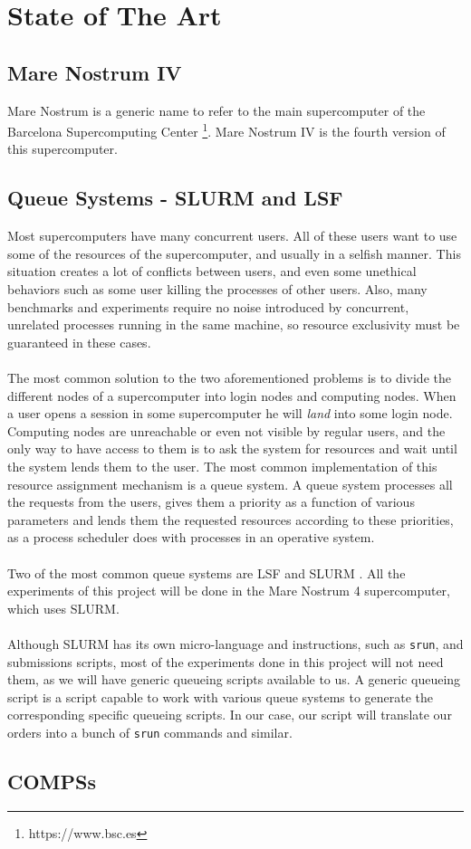 \section{State of The Art}
\label{sec:state_of_the_art}

\subsection{Mare Nostrum IV}
\label{subsec:mare_nostrum}
Mare Nostrum is a generic name to refer to the main supercomputer of the Barcelona Supercomputing Center \footnote{https://www.bsc.es}. Mare Nostrum IV is the fourth version of this supercomputer.

\subsection{Queue Systems - SLURM and LSF}
\label{subsec:hpc_queues}
Most supercomputers have many concurrent users. All of these users want to use some of the resources of the supercomputer, and usually in a selfish manner. This situation creates a lot of conflicts between users, and even some unethical behaviors such as some user killing the processes of other users. Also, many benchmarks and experiments require no noise introduced by concurrent, unrelated processes running in the same machine, so resource exclusivity must be guaranteed in these cases.\\
\\
The most common solution to the two aforementioned problems is to divide the different nodes of a supercomputer into login nodes and computing nodes. When a user opens a session in some supercomputer he will \textit{land} into some login node. Computing nodes are unreachable or even not visible by regular users, and the only way to have access to them is to ask the system for resources and wait until the system lends them to the user. The most common implementation of this resource assignment mechanism is a queue system. A queue system processes all the requests from the users, gives them a priority as a function of various parameters and lends them the requested resources according to these priorities, as a process scheduler does with processes in an operative system.\\
\\
Two of the most common queue systems are LSF \cite{zhou1992lsf} and SLURM \cite{yoo2003slurm}. All the experiments of this project will be done in the Mare Nostrum 4 supercomputer, which uses SLURM.\\
\\
Although SLURM has its own micro-language and instructions, such as \verb|srun|, and submissions scripts, most of the experiments done in this project will not need them, as we will have generic queueing scripts available to us. A generic queueing script is a script capable to work with various queue systems to generate the corresponding specific queueing scripts. In our case, our script will translate our orders into a bunch of \verb|srun| commands and similar.\\

\subsection{COMPSs}
\label{subsec:compss_state_of_the_art}

